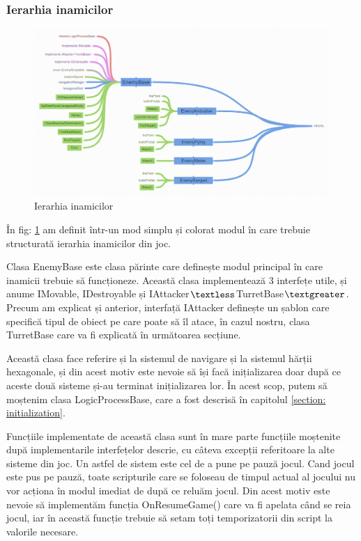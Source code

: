 \documentclass[12pt, a4paper]{article}
\begin{document}
	
	
	
	
	\subsubsection{Ierarhia inamicilor}
	
	\begin{figure}[H]
		\centering
		\includegraphics[width=1\textwidth]{EnemyHierarchy.png}
		\caption{Ierarhia inamicilor}
		\label{fig: enemyHierarchy}
	\end{figure}

	În fig: \ref{fig: enemyHierarchy} am definit într-un mod simplu și colorat modul în care trebuie structurată ierarhia inamicilor din joc.
	\newline
	
	Clasa EnemyBase este clasa părinte care definește modul principal în care inamicii trebuie să funcționeze. Această clasa implementează 3 interfețe utile, și anume IMovable, IDestroyable și IAttacker$\textless$TurretBase$\textgreater$. Precum am explicat și anterior, interfață IAttacker definește un șablon care specifică tipul de obiect pe care poate să îl atace, în cazul nostru, clasa TurretBase care va fi explicată în următoarea secțiune.
	\newline
	
	Această clasa face referire și la sistemul de navigare și la sistemul hărții hexagonale, și din acest motiv este nevoie să își facă inițializarea doar după ce aceste două sisteme și-au terminat inițializarea lor. În acest scop, putem să moștenim clasa LogicProcessBase, care a fost descrisă în capitolul \ref{section: initialization}.
	\newline
	
	Funcțiile implementate de această clasa sunt în mare parte funcțiile \newline moștenite după implementarile interfețelor descrie, cu câteva excepții referitoare la alte sisteme din joc. Un astfel de sistem este cel de a pune pe pauză jocul. Cand jocul este pus pe pauză, toate scripturile care se foloseau de timpul actual al jocului nu vor acționa în modul imediat de după ce reluăm jocul. Din acest motiv este nevoie să implementăm funcția OnResumeGame() care va fi apelata când se reia jocul, iar în această funcție trebuie să setam toți temporizatorii din script la valorile necesare.
	\newline
	
\end{document}
